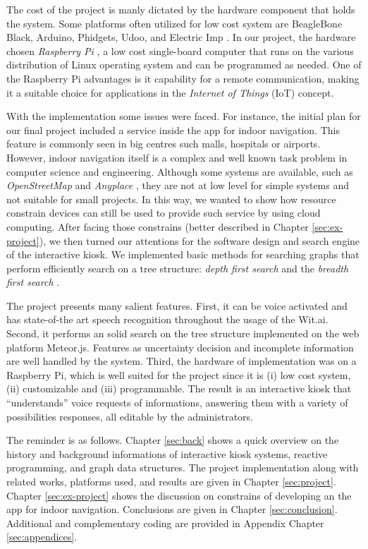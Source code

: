 The cost of the project is manly dictated by the hardware component that holds the system.
Some platforms often utilized for low cost system are BeagleBone Black,  Arduino,  Phidgets, Udoo, and Electric Imp \cite{kubitza2013ingredients,pi2012raspberry}.
In our project, the hardware chosen \emph{Raspberry Pi} \cite{pi2012raspberry}, a low cost single-board computer that runs on the various distribution of Linux operating system and can be programmed as needed.
One of the Raspberry Pi advantages is it capability for a remote communication, making it a suitable choice for applications in the \emph{Internet of Things} (IoT) concept.


With the implementation some issues were faced.
For instance, the initial plan for our final project included a service inside the app for indoor navigation.
This feature is commonly seen in big centres such malls, hospitals or airports.
However, indoor navigation itself is a complex and well known task problem in computer science and engineering.
Although some systems are available, such as \emph{OpenStreetMap} and \emph{Anyplace} \cite{zeinalipour:IEEEIC16}, they are not at low level for simple systems and not suitable for small projects. 
In this way, we wanted to show how resource constrain devices can still be used to provide such service by using cloud computing.
After facing those constrains (better described in Chapter \ref{sec:ex-project}), we then turned our attentions for the software design and search engine of the interactive kiosk.
We implemented basic methods for searching graphs that perform efficiently search on a tree structure: \emph{depth first search} and the \emph{breadth first search} \cite{joyner2010algorithmic}.

The project presents many salient features.
First, it can be voice activated and has state-of-the art speech recognition throughout the usage of the Wit.ai.
Second, it performs an solid search on the tree structure implemented on the web platform Meteor.js.
Features as uncertainty decision and incomplete information are well handled by the system.
Third, the hardware of implementation was on a Raspberry Pi, which is well suited for the project since it is (i) low cost system, (ii) customizable and (iii) programmable.
The result is an interactive kiosk that ``understands'' voice requests of informations, answering them with a variety of possibilities responses, all editable by the administrators.

The reminder is as follows.
Chapter \ref{sec:back} shows a quick overview on the history and background informations of interactive kiosk systems, reactive programming, and graph data structures.
The project implementation along with related works, platforms used, and results are given in Chapter \ref{sec:project}.
Chapter \ref{sec:ex-project} shows the discussion on constrains of developing an the app for indoor navigation.
Conclusions are given in Chapter \ref{sec:conclusion}.
Additional and complementary coding are provided in Appendix Chapter \ref{sec:appendices}.

